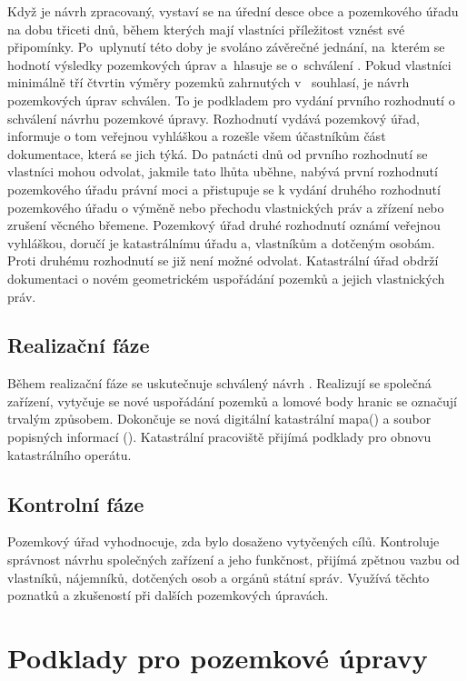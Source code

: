 Když je návrh zpracovaný, vystaví se na úřední desce obce a pozemkového úřadu na dobu třiceti dnů, během kterých mají vlastníci příležitost vznést své připomínky. Po~uplynutí této doby je svoláno závěrečné jednání, na~kterém se hodnotí výsledky pozemkových úprav a~hlasuje se o~schválení . Pokud vlastníci minimálně tří čtvrtin výměry pozemků zahrnutých v~ souhlasí, je návrh pozemkových úprav schválen. To je podkladem pro vydání prvního rozhodnutí o schválení návrhu pozemkové úpravy. Rozhodnutí vydává pozemkový úřad, informuje o tom veřejnou vyhláškou a rozešle všem účastníkům část dokumentace, která se jich týká. Do patnácti dnů od prvního rozhodnutí se vlastníci mohou odvolat, jakmile tato lhůta uběhne, nabývá první rozhodnutí pozemkového úřadu právní moci a přistupuje se k vydání druhého rozhodnutí pozemkového úřadu o výměně nebo přechodu vlastnických práv a zřízení nebo zrušení věcného břemene. Pozemkový úřad druhé rozhodnutí oznámí veřejnou vyhláškou, doručí je katastrálnímu úřadu a, vlastníkům a dotčeným osobám. Proti druhému rozhodnutí se již není možné odvolat. Katastrální úřad obdrží dokumentaci o novém geometrickém uspořádání pozemků a jejich vlastnických práv.

\subsection{Realizační fáze}
\label{realizacni_faze}

Během realizační fáze se uskutečnuje schválený návrh . Realizují se společná zařízení, vytyčuje se nové uspořádání pozemků a lomové body hranic se označují trvalým způsobem. Dokončuje se nová digitální katastrální mapa() a soubor popisných informací (). Katastrální pracoviště přijímá podklady pro obnovu katastrálního operátu.

\subsection{Kontrolní fáze}
\label{kontrolni_faze}

Pozemkový úřad vyhodnocuje, zda bylo dosaženo vytyčených cílů. Kontroluje správnost návrhu společných zařízení a jeho funkčnost, přijímá zpětnou vazbu od vlastníků, nájemníků, dotčených osob a orgánů státní správ. Využívá těchto poznatků a zkušeností při dalších pozemkových úpravách.

\section{Podklady pro pozemkové úpravy}
\label{podklady_pu}

